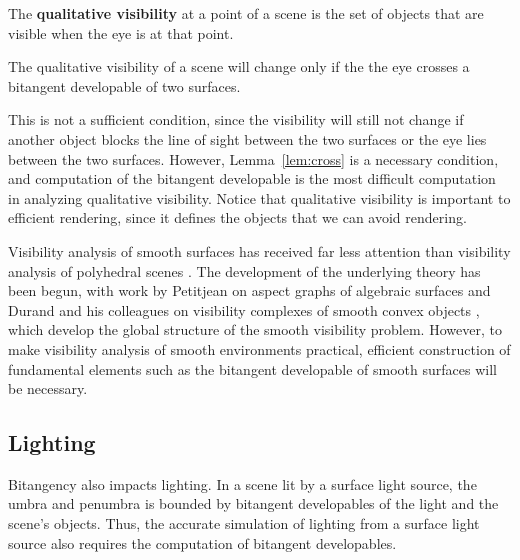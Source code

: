 \documentclass[12pt]{article}
\newif\ifJournal
\begin{document}
\begin{defn2}
The {\bf qualitative visibility} at a point of a scene is 
the set of objects that are visible when the eye is at that point.
\end{defn2}

\begin{lemma}
\label{lem:cross}
The qualitative visibility of a scene will change only if the 
the eye crosses a bitangent developable of two surfaces.
\end{lemma}

This is not a sufficient condition, since
the visibility will still not change if another object blocks the line
of sight between the two surfaces or the eye lies between the two surfaces.
However, Lemma~\ref{lem:cross} is a necessary condition,
and computation of the bitangent developable is the most difficult
computation in analyzing qualitative visibility.
Notice that qualitative visibility is important to efficient rendering, 
since it defines the objects that we can avoid rendering.

Visibility analysis of smooth surfaces has received far less attention
than visibility analysis of polyhedral scenes \cite{durand00}.
The development of the underlying theory has been begun, with work by Petitjean on 
aspect graphs of algebraic surfaces 
\cite{petitjean96} and Durand and his colleagues on
visibility complexes of smooth convex objects \cite{durand97},
which develop the global structure of the smooth visibility problem.
However, to make visibility analysis of smooth environments practical, 
efficient construction of 
fundamental elements such as the bitangent developable of smooth surfaces
will be necessary.


\subsection{Lighting}

Bitangency also impacts lighting.
In a scene lit by a surface light source, the umbra and penumbra
is bounded by bitangent developables of the light and the scene's objects.
Thus, the accurate simulation of lighting from a surface light source
also requires the computation of bitangent developables.

\ifJournal
The umbra is bounded by outer bitangent developables,
and the penumbra by inner bitangent developables.
Give pair of spheres example.
\fi
\end{document}
